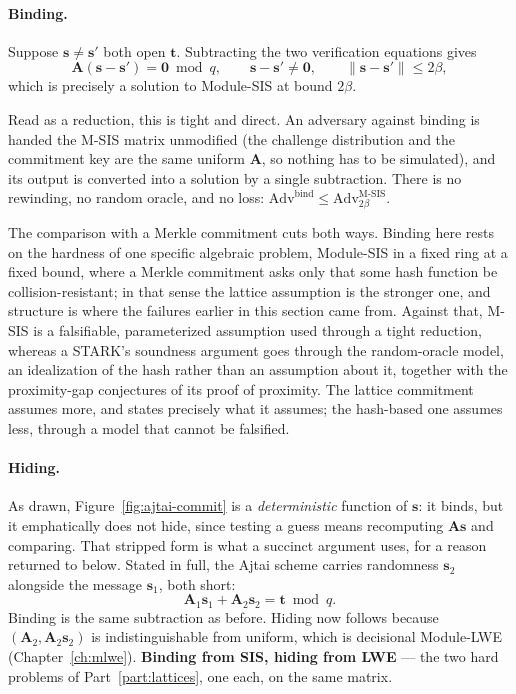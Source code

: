 \paragraph{Binding.}
Suppose $\mathbf{s}\ne\mathbf{s}'$ both open $\mathbf{t}$. Subtracting the two
verification equations gives
\[
  \mathbf{A}(\mathbf{s}-\mathbf{s}') = \mathbf{0} \bmod q,
  \qquad
  \mathbf{s}-\mathbf{s}' \ne \mathbf{0},
  \qquad
  \|\mathbf{s}-\mathbf{s}'\| \le 2\beta ,
\]
which is precisely a solution to Module-SIS at bound $2\beta$.

Read as a reduction, this is tight and direct. An adversary against binding is
handed the M-SIS matrix unmodified (the challenge distribution and the
commitment key are the same uniform $\mathbf{A}$, so nothing has to be
simulated), and its output is converted into a solution by a single
subtraction. There
is no rewinding, no random oracle, and no loss:
$\mathrm{Adv}^{\mathrm{bind}} \le \mathrm{Adv}^{\text{M-SIS}}_{2\beta}$.

The comparison with a Merkle commitment cuts both ways. Binding here rests on
the hardness of one specific algebraic problem, Module-SIS in a fixed ring at a
fixed bound, where a Merkle commitment asks only that some hash function be
collision-resistant; in that sense the lattice assumption is the stronger one,
and structure is where the failures earlier in this section came from. Against
that, M-SIS is a falsifiable, parameterized assumption used through a tight
reduction, whereas a STARK's soundness argument goes through the random-oracle
model, an idealization of the hash rather than an assumption about it, together
with the proximity-gap conjectures of its proof of proximity. The lattice
commitment assumes more, and states precisely what it assumes; the hash-based
one assumes less, through a model that cannot be falsified.

\paragraph{Hiding.}
As drawn, Figure~\ref{fig:ajtai-commit} is a \emph{deterministic} function of
$\mathbf{s}$: it binds, but it emphatically does not hide, since testing a guess
means recomputing $\mathbf{A}\mathbf{s}$ and comparing. That stripped form is
what a succinct argument uses, for a reason returned to below. Stated in full,
the Ajtai scheme carries randomness $\mathbf{s}_2$ alongside the message
$\mathbf{s}_1$, both short:
\[
  \mathbf{A}_1\mathbf{s}_1 + \mathbf{A}_2\mathbf{s}_2 = \mathbf{t} \bmod q .
\]
Binding is the same subtraction as before. Hiding now follows because
$(\mathbf{A}_2,\mathbf{A}_2\mathbf{s}_2)$ is indistinguishable from uniform,
which is decisional Module-LWE (Chapter~\ref{ch:mlwe}). \textbf{Binding from
SIS, hiding from LWE} --- the two hard problems of Part~\ref{part:lattices}, one
each, on the same matrix.

